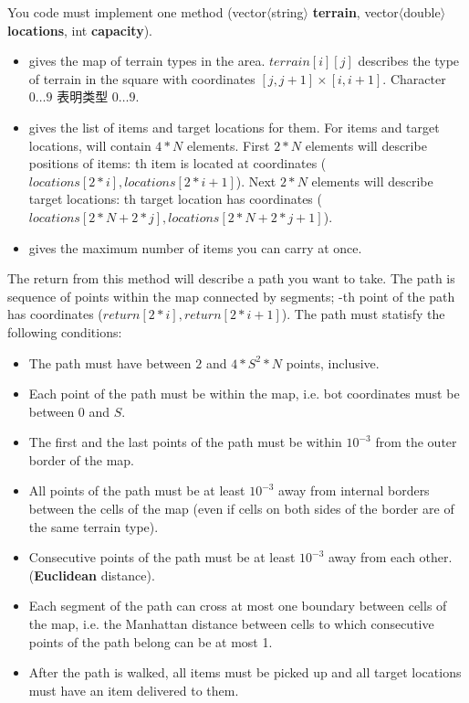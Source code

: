 \documentclass[hyperref,UTF8]{ctexart}
\theoremstyle{definition}
\theoremstyle{remark}
\numberwithin{equation}{subsection}
\newcommand{\Emph}{\textbf}
\begin{document}
	You code must implement one method (vector$\langle$string$\rangle$ \Emph{terrain}, vector$\langle$double$\rangle$ \Emph{locations}, int \Emph{capacity}).
	\begin{itemize}
	
		\item {} gives the map of terrain types in the area. $terrain[i][j]$ describes the type of terrain in the square with
		coordinates $[j, j+1] \times [i, i+1]$. Character $0 \ldots 9$ 表明类型 $0 \ldots 9$.
		
		\item {} gives the list of items and target locations for them. For  items and  target locations,
		 will contain $4 \ast N$ elements. First $2 \ast N$ elements will describe positions of items: th item is located
		at coordinates ($locations[2*i], locations[2*i+1]$). Next $2 \ast N$ elements will describe target locations: th target location
		has coordinates ($locations[2*N+2*j], locations[2*N+2*j+1]$).
		
		\item {} gives the maximum number of items you can carry at once.
		
	\end{itemize}
	
	The return from this method will describe a path you want to take. The path is sequence of points within the map connected by segments;
	-th point of the path has coordinates ($return[2*i], return[2*i+1]$). The path must statisfy the following conditions:
	\begin{itemize}
		
		\item The path must have between $2$ and $4 \ast S^2 \ast N$ points, inclusive.
		
		\item Each point of the path must be within the map, i.e. bot coordinates must be between $0$ and $S$.
		
		\item The first and the last points of the path must be within $10^{-3}$ from the outer border of the map.
		
		\item All points of the path must be at least $10^{-3}$ away from internal borders between the cells of the map (even if cells on both
		sides of the border are of the same terrain type).
		
		\item Consecutive points of the path must be at least $10^{-3}$ away from each other. (\Emph{Euclidean} distance).
		
		\item Each segment of the path can cross at most one boundary between cells of the map, i.e. the Manhattan distance between cells to
		which consecutive points of the path belong can be at most 1.
		
		\item After the path is walked, all items must be picked up and all target locations must have an item delivered to them.
		
	\end{itemize}
	
\end{document}

